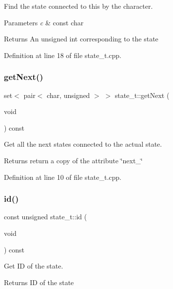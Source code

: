 Find the state connected to this by the character. 


\begin{DoxyParams}{Parameters}
{\em c} & const char \\
\hline
\end{DoxyParams}
\begin{DoxyReturn}{Returns}
An unsigned int corresponding to the state 
\end{DoxyReturn}


Definition at line 18 of file state\+\_\+t.\+cpp.

\mbox{\label{classstate__t_a2ab5aaf45f890ade849fc87a0da80f6a}} 
\subsubsection{get\+Next()}
{\footnotesize\ttfamily set$<$ pair$<$ char, unsigned $>$ $>$ state\+\_\+t\+::get\+Next (\begin{DoxyParamCaption}\item[{void}]{ }\end{DoxyParamCaption}) const}



Get all the next states connected to the actual state. 

\begin{DoxyReturn}{Returns}
return a copy of the attribute \char`\"{}next\+\_\+\char`\"{} 
\end{DoxyReturn}


Definition at line 10 of file state\+\_\+t.\+cpp.

\mbox{\label{classstate__t_ade808c541a78e337c021020842e3c21d}} 
\subsubsection{id()}
{\footnotesize\ttfamily const unsigned state\+\_\+t\+::id (\begin{DoxyParamCaption}\item[{void}]{ }\end{DoxyParamCaption}) const}



Get ID of the state. 

\begin{DoxyReturn}{Returns}
ID of the state 
\end{DoxyReturn}


